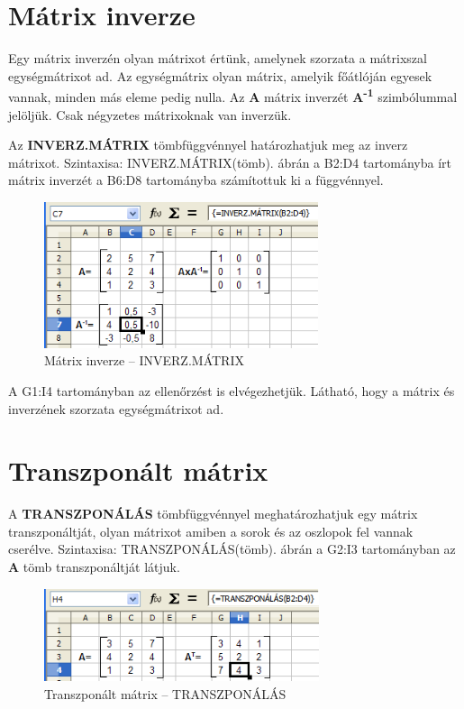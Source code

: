 \section{Mátrix inverze}

Egy mátrix inverzén olyan mátrixot értünk, amelynek szorzata a
mátrixszal egységmátrixot ad. Az egységmátrix olyan mátrix,
amelyik főátlóján egyesek vannak, minden más eleme pedig
nulla. Az \textbf{A} mátrix inverzét \textbf{A\textsuperscript{{}-1}}
szimbólummal jelöljük. Csak négyzetes mátrixoknak van inverzük.

Az \textbf{INVERZ.MÁTRIX} tömbfüggvénnyel határozhatjuk meg az inverz
mátrixot. Szintaxisa: INVERZ.MÁTRIX(tömb).  ábrán a B2:D4
tartományba írt mátrix inverzét a B6:D8 tartományba
számítottuk ki a függvénnyel.

\begin{figure}[!h]
\begin{center}
\includegraphics[width=8.047cm]{oocalcv2-img136.png}
\caption{Mátrix inverze --  INVERZ.MÁTRIX}\label{MátrixInverse}
\end{center}
\end{figure}

A G1:I4 tartományban az ellenőrzést is elvégezhetjük.
Látható, hogy a mátrix és inverzének szorzata
egységmátrixot ad.


\section{Transzponált mátrix}
A \textbf{TRANSZPONÁLÁS} tömbfüggvénnyel meghatározhatjuk egy
mátrix transzponáltját, olyan mátrixot amiben a sorok és az
oszlopok fel vannak cserélve. Szintaxisa: TRANSZPONÁLÁS(tömb). 
 ábrán a G2:I3 tartományban az
\textbf{A} tömb transzponáltját látjuk. 

\begin{figure}[!h]
\begin{center}
\includegraphics[width=8.073cm]{oocalcv2-img137.png}
\caption{Transzponált mátrix --  TRANSZPONÁLÁS}\label{TranszponáltMátrix}
\end{center}
\end{figure}

